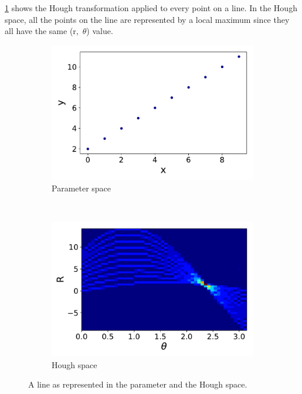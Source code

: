 \documentclass{cernatsnote}
\begin{document}
\cref{HTLine} shows the Hough transformation applied to every point on a line. In the Hough space, all the points on the line are represented by a local maximum since they all have the same (r,~$\theta$) value.
\begin{figure}[ht]
	\centering
	\begin{subfigure}[b]{0.45\textwidth}
        \includegraphics[width=\textwidth]{figures/line.pdf}
        \caption{Parameter space}
    \end{subfigure}
		~ %
		\begin{subfigure}[b]{0.45\textwidth}
					\includegraphics[width=\textwidth]{figures/line_hough.pdf}
					\caption{Hough space}
			\end{subfigure}
	\label{HTLine}
	\caption{A line as represented in the parameter and the Hough space.}
\end{figure}
\end{document}
